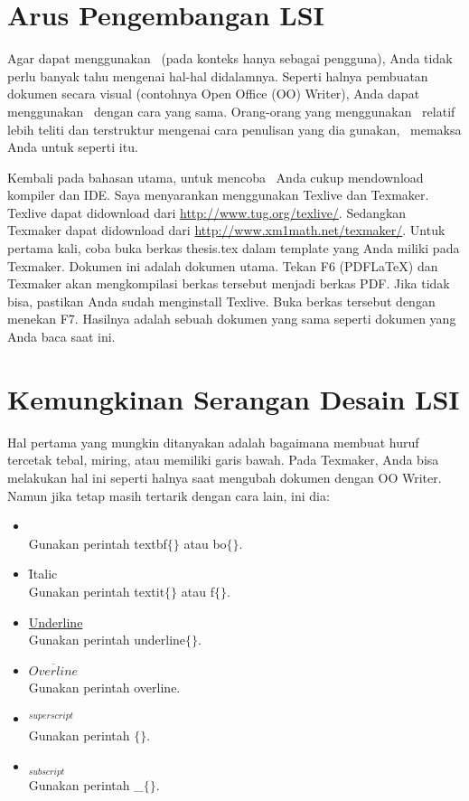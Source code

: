 \section{Arus Pengembangan LSI}

Agar dapat menggunakan \latex~(pada konteks hanya sebagai pengguna), Anda tidak perlu banyak tahu mengenai hal-hal didalamnya. 
Seperti halnya pembuatan dokumen secara visual (contohnya Open Office (OO) Writer), Anda dapat menggunakan \latex~dengan cara yang sama. 
Orang-orang yang menggunakan \latex~relatif lebih teliti dan terstruktur mengenai cara penulisan yang dia gunakan, \latex~memaksa Anda untuk seperti itu.

Kembali pada bahasan utama, untuk mencoba \latex~Anda cukup mendownload kompiler dan IDE. Saya menyarankan menggunakan Texlive dan Texmaker. Texlive dapat didownload dari \url{http://www.tug.org/texlive/}. 
Sedangkan Texmaker dapat didownload dari 
\url{http://www.xm1math.net/texmaker/}. 
Untuk pertama kali, coba buka berkas thesis.tex dalam template yang Anda miliki pada Texmaker. Dokumen ini adalah dokumen utama. 
Tekan F6 (PDFLaTeX) dan Texmaker akan mengkompilasi berkas tersebut menjadi berkas PDF. Jika tidak bisa, pastikan Anda sudah menginstall Texlive. Buka berkas tersebut dengan menekan F7. Hasilnya adalah sebuah dokumen yang sama seperti dokumen yang Anda baca saat ini. 

\section{Kemungkinan Serangan Desain LSI}

Hal pertama yang mungkin ditanyakan adalah bagaimana membuat huruf tercetak tebal, miring, atau memiliki garis bawah. 
Pada Texmaker, Anda bisa melakukan hal ini seperti halnya saat mengubah dokumen dengan OO Writer. Namun jika tetap masih tertarik dengan cara lain, ini dia: 

\begin{itemize}
	\item {} \\
		Gunakan perintah \bslash textbf$\lbrace\rbrace$ atau 
		\bslash bo$\lbrace\rbrace$. 
	\item \f{Italic} \\
		Gunakan perintah \bslash textit$\lbrace\rbrace$ atau 
		\bslash f$\lbrace\rbrace$. 
	\item \underline{Underline} \\
		Gunakan perintah \bslash underline$\lbrace\rbrace$.
	\item $\overline{Overline}$ \\
		Gunakan perintah \bslash overline. 
	\item $^{superscript}$ \\
		Gunakan perintah \bslash $\lbrace\rbrace$. 
	\item $_{subscript}$ \\
		Gunakan perintah \bslash \_$\lbrace\rbrace$. 
\end{itemize}

